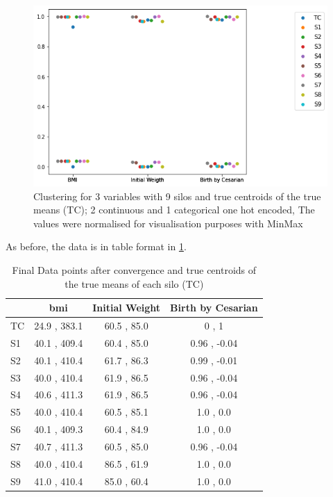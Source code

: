 


\begin{figure}[H]
\centering
\captionsetup{justification=centering}
\caption[Clustering for 3 variables with 9 silos]{Clustering for 3 variables with 9 silos and true centroids of the true means (TC); 2 continuous and 1 categorical one hot encoded, The values were normalised for visualisation purposes with MinMax}\label{fig:cluster_mydata_9s} 
\includegraphics[scale=0.60]{figures/my_cluster_9.png}
\end{figure}

As before, the data is in table format in \ref{tab:datapoints_9}.


\begin{table}[htbp]
\centering
 \setlength{\tabcolsep}{7pt} %
 \renewcommand{\arraystretch}{1.35} %
  \captionsetup{justification=centering} 
\caption{Final Data points after convergence and true centroids of the true means of each silo (TC)}
\label{tab:datapoints_9}
\begin{tabular}{l|ccc}
\toprule
 & \ac{bmi} & Initial Weight & Birth by Cesarian \\
\midrule
TC & 24.9 , 383.1 & 60.5 , 85.0  & 0 , 1 \\
S1 & 40.1 , 409.4 & 60.4 , 85.0 & 0.96 , -0.04 \\
S2 & 40.1 , 410.4 & 61.7 , 86.3 & 0.99 , -0.01 \\
S3 & 40.0 , 410.4 & 61.9 , 86.5 & 0.96 , -0.04 \\
S4 & 40.6 , 411.3 & 61.9 , 86.5 & 0.96 , -0.04 \\
S5 & 40.0 , 410.4 & 60.5 , 85.1 & 1.0 , 0.0 \\
S6 & 40.1 , 409.3 & 60.4 , 84.9 & 1.0 , 0.0 \\
S7 & 40.7 , 411.3 & 60.5 , 85.0 & 0.96 , -0.04 \\
S8 & 40.0 , 410.4 & 86.5 , 61.9 & 1.0 , 0.0 \\
S9 & 41.0 , 410.4 & 85.0 , 60.4 & 1.0 , 0.0 \\
\bottomrule
\end{tabular}
\end{table}




